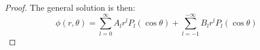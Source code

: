 \documentclass{article}
\begin{document}
\begin{enumerate}
\begin{proof}
              The general solution is then:
              \begin{equation}
                  \phi(r, \theta) = \sum_{l=0}^{\infty}
                  A_{l} r^l
                  P_{l}(\cos \theta)
                  + \sum_{l=-1}^{-\infty}
                  B_{l} r^{l} P_{l}(\cos \theta)
              \end{equation}
          \end{proof}
\end{enumerate}
\end{document}
